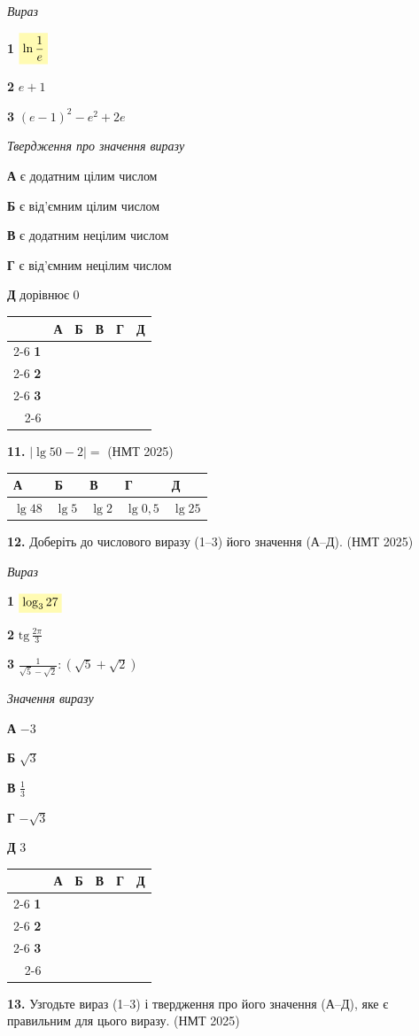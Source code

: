 \documentclass[14pt]{extarticle}
\newcommand{\answerGrid}{
    \begingroup
    \renewcommand{\arraystretch}{1.3} 
    \setlength{\tabcolsep}{7pt} 
    \begin{tabular}{r|c|c|c|c|c|}
         \multicolumn{1}{c}{} & \multicolumn{1}{c}{\textbf{А}} & \multicolumn{1}{c}{\textbf{Б}} & \multicolumn{1}{c}{\textbf{В}} & \multicolumn{1}{c}{\textbf{Г}} & \multicolumn{1}{c}{\textbf{Д}} \\ \cline{2-6}
         \textbf{1} & & & & & \\ \cline{2-6}
         \textbf{2} & & & & & \\ \cline{2-6}
         \textbf{3} & & & & & \\ \cline{2-6}
    \end{tabular}
    \endgroup
}
\newcommand{\matchingLayout}[3]{
    \noindent
    \begin{minipage}[t]{0.40\textwidth}
        #1
    \end{minipage}%
    \hfill
    \begin{minipage}[t]{0.28\textwidth}
        #2
    \end{minipage}%
    \hfill
    \begin{minipage}[t]{0.30\textwidth}
        \vspace{0pt}
        \begin{flushright}
        #3
        \end{flushright}
    \end{minipage}
}
\newcommand{\answerTable}[5]{
\begin{center}
\begin{tabular}{|*{5}{>{\centering\arraybackslash}m{2.8cm}|}}
\hline
\rule[-0.3cm]{0pt}{0.8cm}\textbf{А} & \textbf{Б} & \textbf{В} & \textbf{Г} & \textbf{Д} \\
\hline
\rule[-0.4cm]{0pt}{1.0cm}#1 & \rule[-0.4cm]{0pt}{1.0cm}#2 & \rule[-0.4cm]{0pt}{1.0cm}#3 & \rule[-0.4cm]{0pt}{1.0cm}#4 & \rule[-0.4cm]{0pt}{1.0cm}#5 \\
\hline
\end{tabular}
\end{center}
}
\newcommand{\nmtyear}[1]{\hfill{\small\color{yearcolor}(НМТ #1)}}
\begin{document}
\matchingLayout{\textit{Вираз}

\textbf{1} \quad $\colorbox{yellow!30}{$\ln \dfrac{1}{e}$}$

\textbf{2} \quad $e + 1$

\textbf{3} \quad $(e - 1)^2 - e^2 + 2e$
}{
\textit{Твердження про значення виразу}

\textbf{А} \quad є додатним цілим числом

\textbf{Б} \quad є від'ємним цілим числом

\textbf{В} \quad є додатним нецілим числом

\textbf{Г} \quad є від'ємним нецілим числом

\textbf{Д} \quad дорівнює 0
}{
\answerGrid
}

\vspace{0.8cm}

\noindent\textbf{11.} $|\lg 50 - 2| = $ \nmtyear{2025}
\vspace{0.3cm}

\answerTable{$\lg 48$}{$\lg 5$}{$\lg 2$}{$\lg 0{,}5$}{$\lg 25$}

\vspace{0.5cm}

\noindent\textbf{12.} Доберіть до числового виразу (1--3) його значення (А--Д). \nmtyear{2025}
\vspace{0.3cm}

\matchingLayout{\textit{Вираз}

\textbf{1} \quad $\colorbox{yellow!30}{$\log_3 27$}$

\textbf{2} \quad $\mathrm{tg}\,\displaystyle\frac{2\pi}{3}$

\textbf{3} \quad $\displaystyle\frac{1}{\sqrt{5} - \sqrt{2}} : \left(\sqrt{5} + \sqrt{2}\right)$
}{
\textit{Значення виразу}

\textbf{А} \quad $-3$

\textbf{Б} \quad $\sqrt{3}$

\textbf{В} \quad $\displaystyle\frac{1}{3}$

\textbf{Г} \quad $-\sqrt{3}$

\textbf{Д} \quad $3$
}{
\answerGrid
}

\vspace{0.8cm}

\noindent\textbf{13.} Узгодьте вираз (1--3) і твердження про його значення (А--Д), яке є правильним для цього виразу. \nmtyear{2025}
\vspace{0.3cm}
\end{document}

